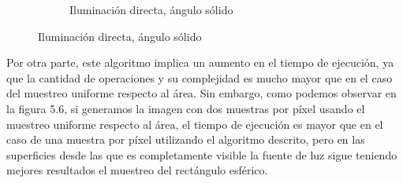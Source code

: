 \begin{figure}[h!]
{\begin{minipage}{\dimexpr .5\textwidth-\fboxsep-2\fboxrule}
\begin{subfigure}{\textwidth}
            \caption{Iluminación directa, ángulo sólido}
            \end{subfigure}%
  \end{minipage}}
\end{figure}

\newpage
Por otra parte, este algoritmo implica un aumento en el tiempo de ejecución, ya que la cantidad de operaciones y su complejidad es mucho mayor que en el caso del muestreo uniforme respecto al área. Sin embargo, como podemos observar en la figura 5.6, si generamos la imagen con dos muestras por píxel usando el muestreo uniforme respecto al área, el tiempo de ejecución es mayor que en el caso de una muestra por píxel utilizando el algoritmo descrito, pero en las superficies desde las que es completamente visible la fuente de luz sigue teniendo mejores resultados el muestreo del rectángulo esférico.

